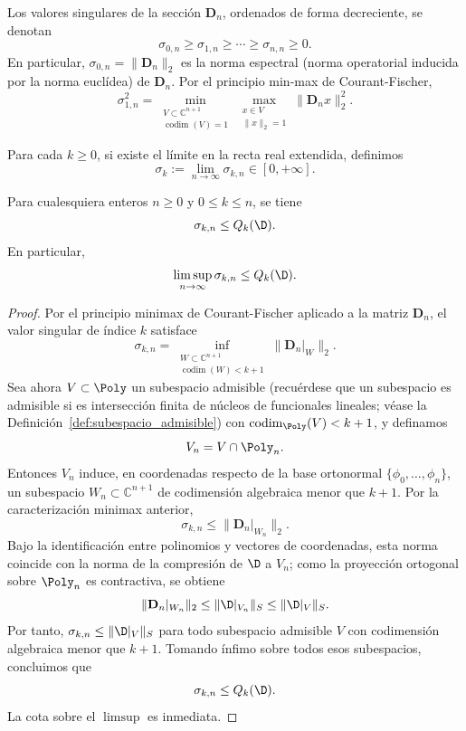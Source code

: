 \begin{defn}\label{def:sigma_kn}
	Los valores singulares de la sección $\mathbf{D}_n$, ordenados de forma decreciente, se denotan
	\[
		\sigma_{0,n} \geq \sigma_{1,n} \geq \cdots \geq \sigma_{n,n} \geq 0.
	\]
	En particular, $\sigma_{0,n} = \|\mathbf{D}_n\|_2$ es la norma espectral (norma operatorial inducida por la norma euclídea) de $\mathbf{D}_n$. Por el principio min-max de Courant-Fischer,
	\[
		\sigma_{1,n}^2 = \min_{\substack{V \subset \mathbb{C}^{n+1} \\ \operatorname{codim}(V) = 1}} \max_{\substack{x \in V \\ \|x\|_2 = 1}} \|\mathbf{D}_n x\|_2^2.
	\]
\end{defn}

\begin{defn}\label{def:indice_Sigma_k}
	Para cada $k\ge 0$, si existe el límite en la recta real extendida, definimos
	\[
		\sigma_k := \lim_{n\to\infty} \sigma_{k,n} \in [0,+\infty].
	\]
\end{defn}

\begin{prop}\label{prop:sigma_qk}
	Para cualesquiera enteros $n \ge 0$ y $0 \le k \le n$, se tiene
	\[
		\sigma_{k,n} \le Q_k(\D).
	\]
	En particular,
	\[
		\limsup_{n \to \infty} \sigma_{k,n} \le Q_k(\D).
	\]
\end{prop}

\begin{proof}
	Por el principio minimax de Courant-Fischer aplicado a la matriz $\mathbf{D}_n$, el valor singular de índice $k$ satisface
	\[
		\sigma_{k,n} = \inf_{\substack{W \subset \mathbb{C}^{n+1} \\ \operatorname{codim}(W) < k+1}} \|\mathbf{D}_n|_W\|_2.
	\]
	Sea ahora $V \subset \Poly$ un subespacio admisible (recuérdese que un subespacio es admisible si es intersección finita de núcleos de funcionales lineales; véase la Definición~\ref{def:subespacio_admisible}) con $\operatorname{codim}_{\Poly}(V) < k+1$, y definamos
	\[
		V_n = V \cap \Poly_{n}.
	\]
	Entonces $V_n$ induce, en coordenadas respecto de la base ortonormal $\{\phi_0,\dots,\phi_{n}\}$, un subespacio $W_n \subset \mathbb{C}^{n+1}$ de codimensión algebraica menor que $k+1$. Por la caracterización minimax anterior,
	\[
		\sigma_{k,n} \le \|\mathbf{D}_n|_{W_n}\|_2.
	\]
	Bajo la identificación entre polinomios y vectores de coordenadas, esta norma coincide con la norma de la compresión de $\D$ a $V_n$; como la proyección ortogonal sobre $\Poly_{n}$ es contractiva, se obtiene
	\[
		\|\mathbf{D}_n|_{W_n}\|_2 \le \|\D|_{V_n}\|_S \le \|\D|_V\|_S.
	\]
	Por tanto, $\sigma_{k,n} \le \|\D|_V\|_S$ para todo subespacio admisible $V$ con codimensión algebraica menor que $k+1$. Tomando ínfimo sobre todos esos subespacios, concluimos que
	\[
		\sigma_{k,n} \le Q_k(\D).
	\]
	La cota sobre el $\limsup$ es inmediata.
\end{proof}

